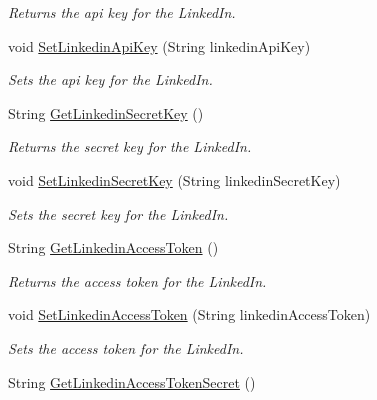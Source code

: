 \begin{DoxyCompactItemize}
\begin{DoxyCompactList}\small\item\em Returns the api key for the Linked\+In. \end{DoxyCompactList}\item 
void \hyperlink{classcom_1_1shephertz_1_1app42_1_1paas_1_1sdk_1_1csharp_1_1social_1_1_social_abbcb6808328fce805320091ae5a1b752}{Set\+Linkedin\+Api\+Key} (String linkedin\+Api\+Key)
\begin{DoxyCompactList}\small\item\em Sets the api key for the Linked\+In. \end{DoxyCompactList}\item 
String \hyperlink{classcom_1_1shephertz_1_1app42_1_1paas_1_1sdk_1_1csharp_1_1social_1_1_social_aab713c0f604a98d9ce0b0c44d991fcfc}{Get\+Linkedin\+Secret\+Key} ()
\begin{DoxyCompactList}\small\item\em Returns the secret key for the Linked\+In. \end{DoxyCompactList}\item 
void \hyperlink{classcom_1_1shephertz_1_1app42_1_1paas_1_1sdk_1_1csharp_1_1social_1_1_social_a921235a10c4154e798374b64f4b5eb25}{Set\+Linkedin\+Secret\+Key} (String linkedin\+Secret\+Key)
\begin{DoxyCompactList}\small\item\em Sets the secret key for the Linked\+In. \end{DoxyCompactList}\item 
String \hyperlink{classcom_1_1shephertz_1_1app42_1_1paas_1_1sdk_1_1csharp_1_1social_1_1_social_a4206561abe0cffc7001f6e4a2018e0e6}{Get\+Linkedin\+Access\+Token} ()
\begin{DoxyCompactList}\small\item\em Returns the access token for the Linked\+In. \end{DoxyCompactList}\item 
void \hyperlink{classcom_1_1shephertz_1_1app42_1_1paas_1_1sdk_1_1csharp_1_1social_1_1_social_a3af462ef08d3c403ae4cd8770cc8f845}{Set\+Linkedin\+Access\+Token} (String linkedin\+Access\+Token)
\begin{DoxyCompactList}\small\item\em Sets the access token for the Linked\+In. \end{DoxyCompactList}\item 
String \hyperlink{classcom_1_1shephertz_1_1app42_1_1paas_1_1sdk_1_1csharp_1_1social_1_1_social_a6ce630a41f1b3192bc3e8f9715dfb578}{Get\+Linkedin\+Access\+Token\+Secret} ()

\end{DoxyCompactItemize}
